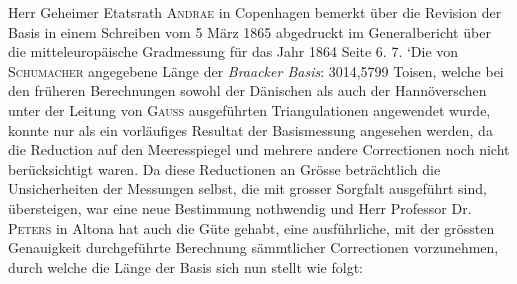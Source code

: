 Herr Geheimer Etatsrath \textsc{Andrae} in Copenhagen bemerkt über die Revision der Basis in einem Schreiben vom 5 März 1865 abgedruckt im Generalbericht über die mitteleuropäische Gradmessung für das Jahr 1864 Seite 6. 7. ‘Die von \textsc{Schumacher} angegebene Länge der \textit{Braacker Basis}: 3014,5799 Toisen, welche bei den früheren Berechnungen sowohl der Dänischen als auch der Hannöverschen unter der Leitung von \textsc{Gauss} ausgeführten Triangulationen angewendet wurde, konnte nur als ein vorläufiges Resultat der Basismessung angesehen werden, da die Reduction auf den Meeresspiegel und mehrere andere Correctionen noch nicht berücksichtigt waren. Da diese Reductionen an Grösse beträchtlich die Unsicherheiten der Messungen selbst, die mit grosser Sorgfalt ausgeführt sind, übersteigen, war eine neue Bestimmung nothwendig und Herr Professor Dr. \textsc{Peters} in Altona hat auch die Güte gehabt, eine ausführliche, mit der grössten Genauigkeit durchgeführte Berechnung sämmtlicher Correctionen vorzunehmen, durch welche die Länge der Basis sich nun stellt wie folgt:
